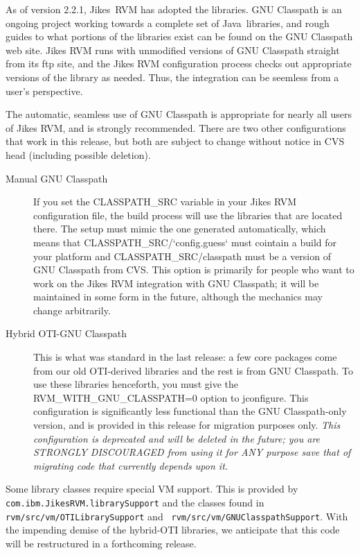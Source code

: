  As of version 2.2.1, Jikes\JikesTMFootnote\ RVM has adopted the
 libraries.  GNU
Classpath is an ongoing project working towards a complete set of
Java\JavaTMFootnote\ libraries, and rough guides to what portions of
the libraries exist can be found on the GNU Classpath web site.  Jikes
RVM runs with unmodified versions of GNU Classpath straight from its
ftp site, and the Jikes RVM configuration process checks out
appropriate versions of the library as needed.  Thus, the integration
can be seemless from a user's perspective.

 The automatic, seamless use of GNU Classpath is appropriate for
nearly all users of Jikes RVM, and is strongly recommended.  There are
two other configurations that work in this release, but both are
subject to change without notice in CVS head (including possible
deletion). 

\begin{description}
\item[Manual GNU Classpath] If you set the CLASSPATH\_SRC variable in
your Jikes RVM configuration file, the build process will use the
libraries that are located there.  The setup must mimic the one
generated automatically, which means that
CLASSPATH\_SRC/`config.guess` must cointain a build for your platform
and CLASSPATH\_SRC/classpath must be a version of GNU Classpath from
CVS.  This option is primarily for people who want to work on the
Jikes RVM integration with GNU Classpath; it will be maintained in
some form in the future, although the mechanics may change
arbitrarily.

\item[Hybrid OTI-GNU Classpath] This is what was standard in
the last release: a few core packages come from our old OTI-derived
libraries and the rest is from GNU Classpath.  To use these libraries
henceforth, you must give the RVM\_WITH\_GNU\_CLASSPATH=0 option to
jconfigure.  This configuration is significantly less functional than
the GNU Classpath-only version, and is provided in this release for
migration purposes only.  {\em This configuration is deprecated and
will be deleted in the future; you are STRONGLY DISCOURAGED from using
it for ANY purpose save that of migrating code that currently depends
upon it.}
\end{description}

 Some library classes require special VM support.  This is provided by
{\tt com.ibm.JikesRVM.librarySupport} and the classes found in
{\tt rvm/src/vm/OTILibrarySupport} and {\tt
rvm/src/vm/GNUClasspathSupport}.  With the impending demise of the
hybrid-OTI libraries, we anticipate that this code will be
restructured in a forthcoming release.

\JavaTMFooter
\JikesTMFooter

